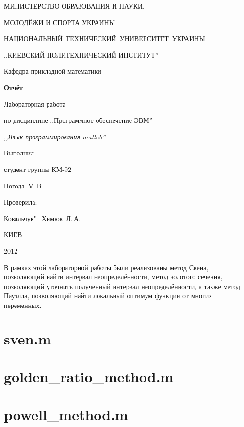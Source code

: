\documentclass[a4paper,12pt,notitlepage,headsepline,pdftex]{scrartcl}
\begin{document}
\begin{titlepage}
  \begin{center}
    \large
    \MakeUppercase{Министерство образования и науки,}

    \MakeUppercase{молодёжи и спорта Украины}

    \mbox{\MakeUppercase{Национальный технический университет Украины}}

    \MakeUppercase{,,Киевский политехнический институт''}

    \addvspace{6pt}

    \normalsize
    Кафедра прикладной математики

    \vfill

    \textbf{Отчёт}

    Лабораторная работа 

    по дисциплине ,,Программное обеспечение ЭВМ''

    \emph{,,Язык программирования matlab''}
  \end{center}

  \vfill

  \noindent
  \begin{minipage}{0.3\textwidth}
    Выполнил

    студент группы КМ-92

    Погода~М.\,В.
  \end{minipage}
  \hfill
  \begin{minipage}{0.4\textwidth}
    Проверила:

    Ковальчук"=Химюк~Л.\,А.
  \end{minipage}
  \vfill

  \begin{center}
    КИЕВ

    2012
  \end{center}
\end{titlepage}
  В рамках этой лабораторной работы были реализованы метод Свена, позволяющий
  найти интервал неопределённости, метод золотого сечения, позволяющий
  уточнить полученный интервал неопределённости, а также метод Пауэлла,
  позволяющий найти локальный оптимум функции от многих переменных.

  \section*{sven.m}
    
  \section*{golden\_ratio\_method.m}
    
  \section*{powell\_method.m}
    
\end{document}
